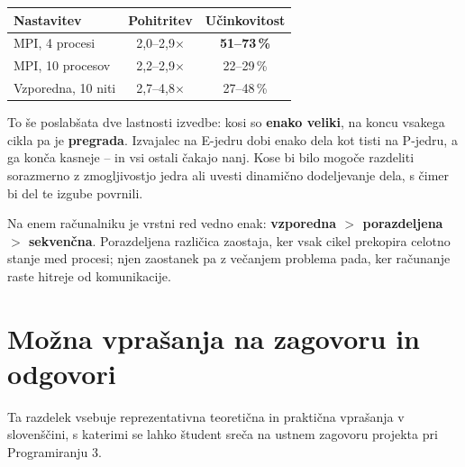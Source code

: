 \documentclass[11pt,a4paper]{article}
\begin{document}
\begin{center}
\begin{tabular}{|l|c|c|}
\hline
\textbf{Nastavitev} & \textbf{Pohitritev} & \textbf{U\v{c}inkovitost} \\
\hline
MPI, 4 procesi  & 2,0--2,9$\times$ & \textbf{51--73\,\%} \\
MPI, 10 procesov & 2,2--2,9$\times$ & 22--29\,\% \\
Vzporedna, 10 niti & 2,7--4,8$\times$ & 27--48\,\% \\
\hline
\end{tabular}
\end{center}

To \v{s}e poslab\v{s}ata dve lastnosti izvedbe: kosi so \textbf{enako veliki}, na koncu vsakega cikla pa je \textbf{pregrada}. Izvajalec na E-jedru dobi enako dela kot tisti na P-jedru, a ga kon\v{c}a kasneje -- in vsi ostali \v{c}akajo nanj. Kose bi bilo mogo\v{c}e razdeliti sorazmerno z zmogljivostjo jedra ali uvesti dinami\v{c}no dodeljevanje dela, s \v{c}imer bi del te izgube povrnili.

\begin{tcolorbox}[colback=yellow!5!white, colframe=yellow!75!black, title=Sklep]
Na enem ra\v{c}unalniku je vrstni red vedno enak: \textbf{vzporedna $>$ porazdeljena $>$ sekven\v{c}na}. Porazdeljena razli\v{c}ica zaostaja, ker vsak cikel prekopira celotno stanje med procesi; njen zaostanek pa z ve\v{c}anjem problema pada, ker ra\v{c}unanje raste hitreje od komunikacije.
\end{tcolorbox}

\newpage
\section{Mo\v{z}na vpra\v{s}anja na zagovoru in odgovori}

Ta razdelek vsebuje reprezentativna teoretična in praktična vprašanja v slovenščini, s katerimi se lahko \v{s}tudent sreča na ustnem zagovoru projekta pri Programiranju 3.
\end{document}
